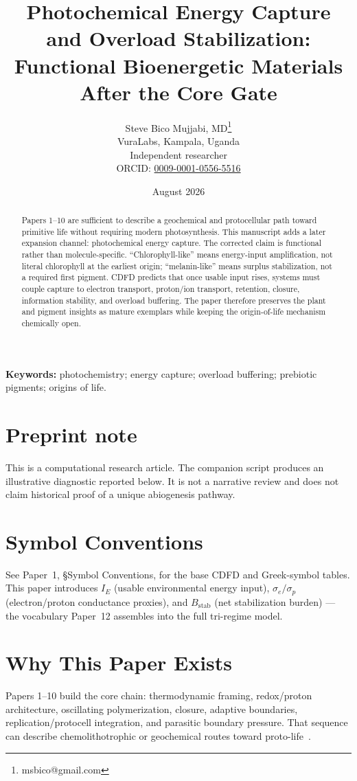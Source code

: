 \documentclass[11pt,a4paper]{article}
\title{Photochemical Energy Capture and Overload Stabilization:\\ Functional Bioenergetic Materials After the Core Gate}
\author{Steve Bico Mujjabi, MD\thanks{msbico@gmail.com}\\
VuraLabs, Kampala, Uganda\\
Independent researcher\\
ORCID: \href{https://orcid.org/0009-0001-0556-5516}{0009-0001-0556-5516}}
\date{August 2026}
\begin{document}
\maketitle

\begin{abstract}
Papers 1--10 are sufficient to describe a geochemical and protocellular path toward primitive life without requiring modern photosynthesis. This manuscript adds a later expansion channel: photochemical energy capture. The corrected claim is functional rather than molecule-specific. ``Chlorophyll-like'' means energy-input amplification, not literal chlorophyll at the earliest origin; ``melanin-like'' means surplus stabilization, not a required first pigment. CDFD predicts that once usable input rises, systems must couple capture to electron transport, proton/ion transport, retention, closure, information stability, and overload buffering. The paper therefore preserves the plant and pigment insights as mature exemplars while keeping the origin-of-life mechanism chemically open.
\end{abstract}

\noindent\textbf{Keywords:} photochemistry; energy capture; overload buffering; prebiotic pigments; origins of life.

\section*{Preprint note}
This is a computational research article. The companion script produces an illustrative diagnostic reported below. It is not a narrative review and does not claim historical proof of a unique abiogenesis pathway.

\section*{Symbol Conventions}

\noindent See Paper~1, \S Symbol Conventions, for the base CDFD and Greek-symbol tables. This paper introduces $I_E$ (usable environmental energy input), $\sigma_e/\sigma_p$ (electron/proton conductance proxies), and $B_{\mathrm{stab}}$ (net stabilization burden) --- the vocabulary Paper~12 assembles into the full tri-regime model.

\section{Why This Paper Exists}
Papers 1--10 build the core chain: thermodynamic framing, redox/proton
architecture, oscillating polymerization, closure, adaptive boundaries,
replication/protocell integration, and parasitic boundary pressure. That
sequence can describe chemolithotrophic or geochemical routes toward
proto-life~\cite{Russell1994,Martin2007,Lane2010}.
\end{document}

